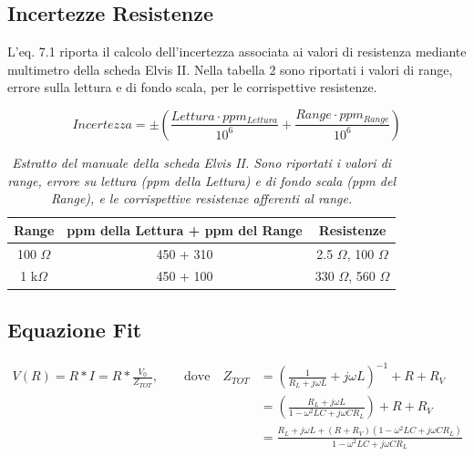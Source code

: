 \documentclass[12pt]{article}
\numberwithin{equation}{section}
\begin{document}
\subsection{Incertezze Resistenze}
\label{app:Incertezze}
L'eq. 7.1 riporta il calcolo dell'incertezza associata ai valori di resistenza mediante multimetro della scheda Elvis II. Nella tabella 2 sono riportati i valori di range, errore sulla lettura e di fondo scala, per le corrispettive resistenze.

\begin{equation}
    Incertezza = \pm \left(\frac{Lettura\cdot ppm_{Lettura}}{10^6}+\frac{Range\cdot ppm_{Range}}{10^6}\right)
\end{equation}

\begin{table}[H]
\centering
\begin{tabular}{||c | c | c ||} 
 \hline
 Range & ppm della Lettura + ppm del Range  & Resistenze \\ [0.5ex] 
 \hline\hline
 100 $\Omega$ & 450 + 310 & 2.5 $\Omega$, 100 $\Omega$ \\
 \hline
 1 k$\Omega$ & 450 + 100 & 330 $\Omega$, 560 $\Omega$\\ 
 \hline
\end{tabular}
\label{tab:res}
\caption{\textit{Estratto del manuale della scheda Elvis II. Sono riportati i valori di range, errore su lettura (ppm della Lettura) e di fondo scala (ppm del Range), e le corrispettive resistenze afferenti al range.}}
\end{table}

\subsection{Equazione Fit}
\label{app:Dimostrazione}

\begin{equation}
\begin{split}
    V(R) = R*I = R * \frac{V_0}{Z_{TOT}},
    \qquad \text{dove} \quad
    Z_{TOT} & = \left(\frac{1}{R_L + j\omega L} + j\omega L\right)^{-1} + R + R_V \\
    & = \left(\frac{R_L+j \omega L}{1 - \omega ^2 LC + j \omega C R_L}\right) + R + R_V \\
    & = \frac{R_L + j \omega L + (R + R_V) (1 - \omega ^2 L C + j \omega C R_L)}{1 - \omega ^2 L C + j \omega C R_L}    
\end{split}
\end{equation}
\end{document}
